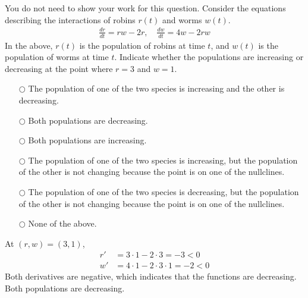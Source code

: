 \ifnum {}    
\question[1] You do not need to show your work for this question. Consider the equations describing the interactions of robins $r(t)$ and worms $w(t)$.
\begin{align}
    \frac{dr}{dt} = rw-2r, \quad \frac{dw}{dt} = 4w-2rw
\end{align}
In the above, $r(t)$ is the population of robins at time $t$, and $w(t)$ is the population of worms at time $t$. Indicate whether the populations are increasing or decreasing at the point where $r=3$ and $w=1$. 
\begin{itemize}
    \item[$\bigcirc$] The population of one of the two species is increasing and the other is decreasing. 
    \item[$\bigcirc$]Both populations are decreasing.
    \item[$\bigcirc$]Both populations are increasing.
    \item[$\bigcirc$]The population of one of the two species is increasing, but the population of the other is not changing because the point is on one of the nullclines. 
    \item[$\bigcirc$]The population of one of the two species is decreasing, but the population of the other is not changing because the point is on one of the nullclines. 
    \item[$\bigcirc$]None of the above.
\end{itemize}
\ifnum {} {\color{DarkBlue}
At $(r,w)=(3,1)$, 
\begin{align}
    r' &= 3\cdot1 - 2\cdot 3 = - 3 < 0\\
    w' &= 4\cdot1-2\cdot3\cdot1 = -2 < 0 
\end{align}
Both derivatives are negative, which indicates that the functions are decreasing. Both populations are decreasing. 
} 
\else 
\vspace{0.5cm}
\fi    
\fi 



